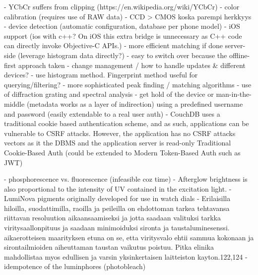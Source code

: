 \documentclass[thesis.tex]{subfiles}
\begin{document}
- YCbCr suffers from clipping (https://en.wikipedia.org/wiki/YCbCr)
- color calibration (requires use of RAW data)
  - CCD > CMOS koska parempi herkkyys
- device detection (automatic configuration, database per phone model)
- iOS support (ios with c++? On iOS this extra bridge is unnecessary as C++ code can directly invoke Objective-C APIs.)
- more efficient matching if done server-side (leverage histogram data directly?)
  - easy to switch over because the offline-first approach taken
- change management / how to handle updates \& different devices?
- use histogram method. Fingerprint method useful for querying/filtering?
- more sophisticated peak finding / matching algorithms
- use of diffraction grating and spectral analysis
- get hold of the device or man-in-the-middle (metadata works as a layer of indirection)
using a predefined username and password (easily extendable to a real user auth)
- CouchDB uses a traditional cookie based authentication scheme, and as such, applications can be vulnerable to CSRF attacks. However, the application has no CSRF attacks vectors as it the DBMS and the application server is read-only
Traditional Cookie-Based Auth (could be extended to Modern Token-Based Auth such as JWT)

- phosphorescence vs. fluorescence (infeasible coz time)
- Afterglow brightness is also proportional to the intensity of UV contained in the excitation light.
- LumiNova pigments originally developed for use in watch dials
- Erilaisilla hiloilla, suodattimilla, raoilla ja peileilla on ehdottoman tarkea tehtavansa riittavan resoluution aikaansaamiseksi ja jotta saadaan valituksi tarkka viritysaallonpituus ja saadaan minimoiduksi sironta ja taustaluminesenssi. aikaerotteisen maarityksen etuna on se, etta viritysvalo ehtii sammua kokonaan ja sirontailmioiden aiheuttaman taustan vaikutus poistuu. Pitka elinika mahdollistaa myos edullisen ja varsin yksinkertaisen laitteiston kayton.122,124
- idempotence of the luminphores (photobleach)
\end{document}
